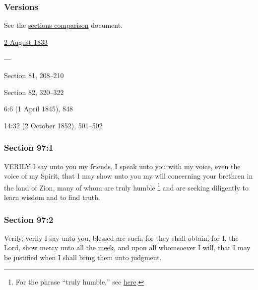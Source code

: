 	\subsubsection{Versions}
		\label{DC97-V}
		
		See the \href{https://drive.google.com/file/d/1goAvNz8jS4R8slYfMG_db55Ty2z_vmgK/view?usp=sharing}{sections comparison} document.
	
		\begin{compactdesc}
			\item[JSP] \hyperref[EMS-1833-JS-2-AUG-1833-A]{2 August 1833}
			\item[BC] ---
			\item[DC 1835] Section 81, 208--210
			\item[DC 1844] Section 82, 320--322
			\item[TS] 6:6 (1 April 1845), 848
			\item[MS] 14:32 (2 October 1852), 501--502
		\end{compactdesc}

	\subsubsection{Section 97:1} %
		\label{DC97-1}

		VERILY I say unto you my friends, I speak unto you with my voice, even the voice of my Spirit, that I may show unto you my will concerning your brethren in the land of Zion, many of whom are truly humble%
			\footnote{%
				For the phrase ``truly humble,'' see \hyperref[HUMILITY-PHRASES]{here}.
				}
		and are seeking diligently to learn wisdom and to find truth.


	\subsubsection{Section 97:2} %
		\label{DC97-2}

		Verily, verily I say unto you, blessed are such, for they shall obtain; for I, the Lord, show mercy unto all the \hyperref[MEEKNESS]{meek}, and upon all whomsoever I will, that I may be justified when I shall bring them unto judgment.


